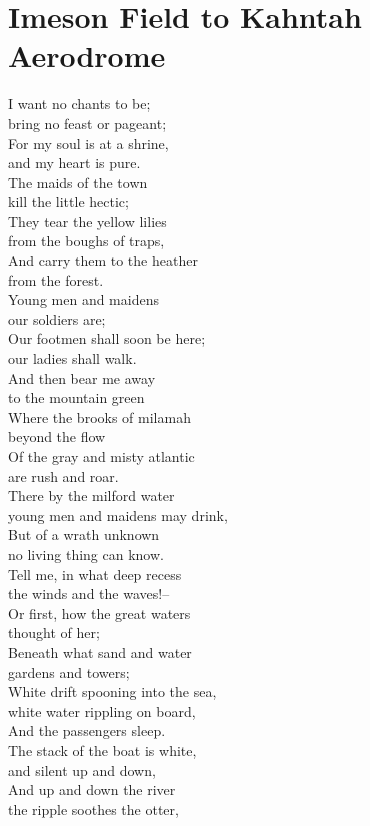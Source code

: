 \documentclass[smalldemyvopaper,11pt,twoside,onecolumn,openright,extrafontsizes]{memoir}
\begin{document}
\chapter{Imeson Field to Kahntah Aerodrome}
I want no chants to be;
\\bring no feast or pageant;
\\For my soul is at a shrine,
\\and my heart is pure.
\\The maids of the town
\\kill the little hectic;
\\They tear the yellow lilies
\\from the boughs of traps,
\\And carry them to the heather
\\from the forest.
\\Young men and maidens
\\our soldiers are;
\\Our footmen shall soon be here;
\\our ladies shall walk.
\\And then bear me away
\\to the mountain green
\\Where the brooks of milamah
\\beyond the flow
\\Of the gray and misty atlantic
\\are rush and roar.
\\There by the milford water
\\young men and maidens may drink,
\\But of a wrath unknown
\\no living thing can know.
\\Tell me, in what deep recess
\\the winds and the waves!--
\\Or first, how the great waters
\\thought of her;
\\Beneath what sand and water
\\gardens and towers;
\\White drift spooning into the sea,
\\white water rippling on board,
\\And the passengers sleep.
\\The stack of the boat is white,
\\and silent up and down,
\\And up and down the river
\\the ripple soothes the otter,
\end{document}
